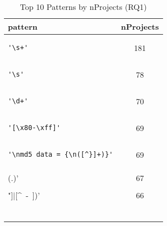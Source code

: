 \begin{table}
\begin{center}
\caption{Top 10 Patterns by nProjects (RQ1)}
\label{table:topNW}
\begin{tabular}{lc}
\toprule
pattern & nProjects \\
\midrule
\begin{minipage}{2.4in}
\begin{verbatim}
'\s+'\end{verbatim}
\end{minipage}
& 181 \\
\midrule
\begin{minipage}{2.4in}
\begin{verbatim}
'\s'\end{verbatim}
\end{minipage}
& 78 \\
\midrule
\begin{minipage}{2.4in}
\begin{verbatim}
'\d+'\end{verbatim}
\end{minipage}
& 70 \\
\midrule
\begin{minipage}{2.4in}
\begin{verbatim}
'[\x80-\xff]'\end{verbatim}
\end{minipage}
& 69 \\
\midrule
\begin{minipage}{2.4in}
\begin{verbatim}
'\nmd5_data = {\n([^}]+)}'\end{verbatim}
\end{minipage}
& 69 \\
\midrule
\begin{minipage}{2.4in}
\begin{verbatim}
'\\(.)'\end{verbatim}
\end{minipage}
& 67 \\
\midrule
\begin{minipage}{2.4in}
\begin{verbatim}
'([\\"]|[^\ -~])'\end{verbatim}
\end{minipage}
& 66 \\
\midrule
\begin{minipage}{2.4in}
\begin{verbatim}

\end{verbatim}
\end{minipage}
\end{tabular}
\end{center}
\end{table}
